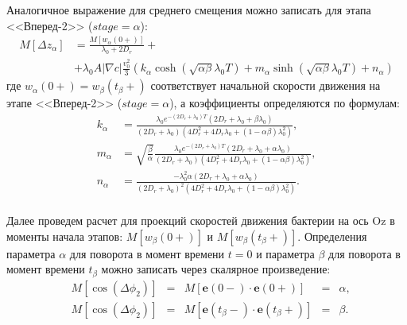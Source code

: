 Аналогичное выражение для среднего смещения можно записать для этапа <<Вперед-2>> ($stage=\alpha$):
\begin{equation}
    \begin{aligned}
        M[\Delta z_{\alpha}]&=\frac{M[w_{\alpha}(0+)]}{\lambda_0+2 D_r} +\\ &+ \lambda_0 A |\nabla c| \frac{v_0^2}{3} \left ( k_{\alpha} \cosh(\sqrt{\alpha \beta} \lambda_0 T) + m_{\alpha} \sinh(\sqrt{\alpha \beta} \lambda_0 T) + n_{\alpha} \right )
        \label{eq:mdlrd-solution-alpha}
    \end{aligned}
\end{equation}
где $w_{\alpha}(0+)=w_{\beta}(t_{\beta}+)$ соответствует начальной скорости движения на этапе <<Вперед-2>> ($stage=\alpha$), а коэффициенты определяются по формулам:
\begin{equation}
    \begin{aligned}
        k_{\alpha}&=\frac{\lambda_0 e^{-(2D_r+\lambda_0)T}(2D_r+\lambda_0+\beta\lambda_0)}{(2D_r+\lambda_0)(4D_r^2+4D_r\lambda_0+(1-\alpha\beta)\lambda_0^2)}, \\
        m_{\alpha}&=\sqrt{\frac{\beta}{\alpha}}\frac{\lambda_0 e^{-(2D_r+\lambda_0)T}(2D_r+\lambda_0+\alpha\lambda_0)}{(2D_r+\lambda_0)(4D_r^2+4D_r\lambda_0+(1-\alpha\beta)\lambda_0^2)}, \\
        n_{\alpha}&=\frac{-\lambda_0^2 \alpha (2D_r+\lambda_0+\alpha\lambda_0)}{(2D_r+\lambda_0)^2(4D_r^2+4D_r\lambda_0+(1-\alpha\beta)\lambda_0^2)}. \\
        \label{eq:mdlrd-solution-alpha-coeffs}
    \end{aligned}
\end{equation}

Далее проведем расчет для проекций скоростей движения бактерии на ось Oz в моменты начала этапов: $M[w_{\beta}(0+)]$ и $M[w_{\beta}(t_{\beta}+)]$. Определения параметра $\alpha$ для поворота в момент времени $t=0$ и параметра $\beta$ для поворота в момент времени $t_{\beta}$ можно записать через скалярное произведение:
\begin{equation}
    \begin{aligned}
        &M[\cos (\Delta\phi_2)]&=&M[\textbf{e}(0-) \cdot \textbf{e}(0+)]&=&\alpha, \\
        &M[\cos (\Delta\phi_2)]&=&M[\textbf{e}(t_{\beta}-) \cdot \textbf{e}(t_{\beta}+)]&=&\beta. \\
        \label{eq:alpha-beta-definition}
    \end{aligned}
\end{equation}

